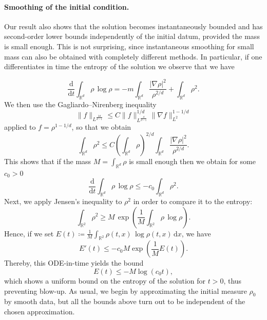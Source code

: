 \documentclass[11pt,a4paper]{article}
\numberwithin{equation}{section}
\newcommand{\R}{{\mathbb{R}}}
\theoremstyle{plain}
\theoremstyle{remark}
\begin{document}


\paragraph{Smoothing of the initial condition.}

Our result also shows that the solution becomes instantaneously bounded and has second-order lower bounds independently of the initial datum, provided the mass is small enough. This is not surprising, since instantaneous smoothing for small mass can also be obtained with completely different methods. In particular, if one differentiates in time the entropy of the solution we observe that we have

\[
\frac{\mathrm{d}}{\mathrm{d}t}
  \int_{\R^d}\rho\,\log\rho
  =-m
\int_{\R^d}\frac{\lvert\nabla\rho\rvert^2}{\,\rho^{2/d}\,}
  +
\int_{\R^d}\rho^2 .
\]
We then use the Gagliardo--Nirenberg
inequality 
$$\|f\|_{L^{\frac{2d}{d-1}}}\leq C\|f \|_{L^{\frac{d}{d-1}}}^{1/d}\|\nabla f\|_{L^2}^{1-1/d}$$
applied to $f=\rho^{1-1/d}$, so that we obtain
$$\int_{\R^d}\rho^2\leq C\left(\int_{\R^d} \rho\right)^{2/d}\int_{\R^d}\frac{\lvert\nabla\rho\rvert^2}{\,\rho^{2/d}\,}.$$
This shows that if the mass $M=\int_{\R^d} \rho$ is small enough then we obtain for some $c_0>0$
\[
\frac{\mathrm{d}}{\mathrm{d}t}
  \int_{\R^d}\rho\,\log\rho
  \le 
- c_0\!\int_{\R^d}\rho^2.
\]
Next, we apply Jensen's inequality to $\rho^2$ in order to compare it to the entropy:
\[
\int_{\R^2}\rho^2
   \ge 
M\,\exp\! \left(\frac1M\!\int_{\R^2}\!\rho\,\log\rho\right).
\]
Hence, if we set 
$E(t) \coloneqq \frac1M\int_{\R^2}\rho(t,x)\,\log\rho(t,x)\,\mathrm{d}x$, we have
\[
E'(t)  \le  - c_0M\exp\! \left(\frac 1M E(t)\right).
\]
Thereby, this ODE-in-time yields the bound
\[
E(t)
  \le  -M
\log\! \left(c_0 t\right),
\]
 which shows a uniform bound on the entropy of the solution for $t>0$, thus preventing blow-up.  As usual, we begin by approximating the initial measure \(\rho_{0}\) by smooth data, but all the bounds above turn out to be independent of the chosen approximation.
\end{document}
